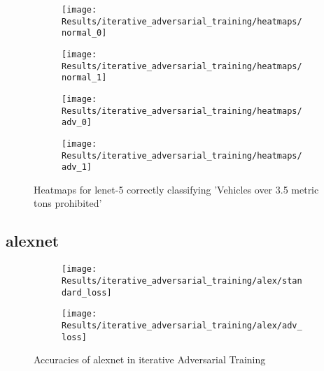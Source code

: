 \documentclass[draft,final]{vutinfth} %
\begin{document}
\begin{figure}[h]
	\begin{subfigure}[b]{0.5\columnwidth}
		\centering
    \texttt{[image: Results/iterative\_adversarial\_training/heatmaps/normal\_0]}
    \label{fig:exp:iat:lenet-5-heat:normal_0}
  \end{subfigure}
  \begin{subfigure}[b]{0.5\columnwidth}
		\centering
    \texttt{[image: Results/iterative\_adversarial\_training/heatmaps/normal\_1]}
    \label{fig:exp:iat:lenet-5-heat:normal_1}
  \end{subfigure}

	\begin{subfigure}[b]{0.5\columnwidth}
		\centering
    \texttt{[image: Results/iterative\_adversarial\_training/heatmaps/adv\_0]}
    \label{fig:exp:iat:lenet-5-heat:adv_0}
  \end{subfigure}
  \begin{subfigure}[b]{0.5\columnwidth}
		\centering
    \texttt{[image: Results/iterative\_adversarial\_training/heatmaps/adv\_1]}
    \label{fig:exp:iat:lenet-5-heat:adv_0}
  \end{subfigure}
  \caption{Heatmaps for lenet-5 correctly classifying 'Vehicles over 3.5 metric tons prohibited'}
\end{figure}

\subsection{alexnet}

\begin{figure}[h]
  \begin{subfigure}[b]{0.5\columnwidth}
		\centering
    \texttt{[image: Results/iterative\_adversarial\_training/alex/standard\_loss]}
    \label{fig:exp:iat:alex:data}
  \end{subfigure}
  \begin{subfigure}[b]{0.5\columnwidth}
		\centering
    \texttt{[image: Results/iterative\_adversarial\_training/alex/adv\_loss]}
    \label{fig:exp:iat:alex:loss}
  \end{subfigure}
  \caption{Accuracies of alexnet in iterative Adversarial Training}
\end{figure}
\end{document}
